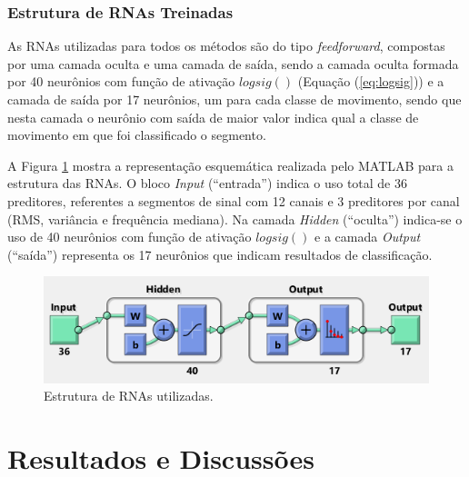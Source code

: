 			\subsection{Estrutura de RNAs Treinadas}
As RNAs utilizadas para todos os métodos são do tipo \emph{feedforward}, compostas por uma camada oculta e uma camada de saída, sendo a camada oculta formada por 40 neurônios com função de ativação $logsig()$ (Equação (\ref{eq:logsig})) e a camada de saída por 17 neurônios, um para cada classe de movimento, sendo que nesta camada o neurônio com saída de maior valor indica qual a classe de movimento em que foi classificado o segmento.

A Figura \ref{fig:matlabRNA} mostra a representação esquemática realizada pelo MATLAB para a estrutura das RNAs. O bloco \emph{Input} (``entrada'') indica o uso total de 36 preditores, referentes a segmentos de sinal com 12 canais e 3 preditores por canal (RMS, variância e frequência mediana). Na camada \emph{Hidden} (``oculta'') indica-se o uso de 40 neurônios com função de ativação $logsig()$ e a camada \emph{Output} (``saída'') representa os 17 neurônios que indicam resultados de classificação.

\begin{figure}[htb]
	\caption{\label{fig:matlabRNA}Estrutura de RNAs utilizadas.}
	\begin{center}
	    \includegraphics[width=0.75\linewidth]{./img/matlabRNA.png}
	\end{center}
\end{figure}


	\chapter{Resultados e Discussões}
